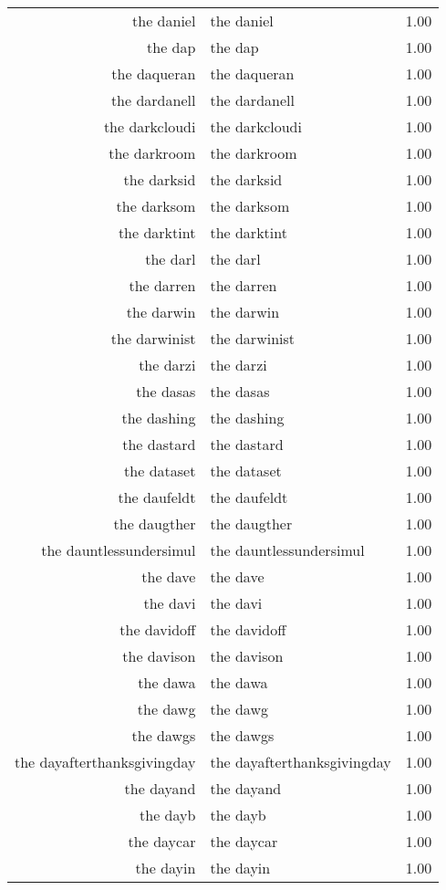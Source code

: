 \begin{table}[ht]
\begin{tabular}{rlr}
  the daniel & the daniel & 1.00 \\ 
  the dap & the dap & 1.00 \\ 
  the daqueran & the daqueran & 1.00 \\ 
  the dardanell & the dardanell & 1.00 \\ 
  the darkcloudi & the darkcloudi & 1.00 \\ 
  the darkroom & the darkroom & 1.00 \\ 
  the darksid & the darksid & 1.00 \\ 
  the darksom & the darksom & 1.00 \\ 
  the darktint & the darktint & 1.00 \\ 
  the darl & the darl & 1.00 \\ 
  the darren & the darren & 1.00 \\ 
  the darwin & the darwin & 1.00 \\ 
  the darwinist & the darwinist & 1.00 \\ 
  the darzi & the darzi & 1.00 \\ 
  the dasas & the dasas & 1.00 \\ 
  the dashing & the dashing & 1.00 \\ 
  the dastard & the dastard & 1.00 \\ 
  the dataset & the dataset & 1.00 \\ 
  the daufeldt & the daufeldt & 1.00 \\ 
  the daugther & the daugther & 1.00 \\ 
  the dauntlessundersimul & the dauntlessundersimul & 1.00 \\ 
  the dave & the dave & 1.00 \\ 
  the davi & the davi & 1.00 \\ 
  the davidoff & the davidoff & 1.00 \\ 
  the davison & the davison & 1.00 \\ 
  the dawa & the dawa & 1.00 \\ 
  the dawg & the dawg & 1.00 \\ 
  the dawgs & the dawgs & 1.00 \\ 
  the dayafterthanksgivingday & the dayafterthanksgivingday & 1.00 \\ 
  the dayand & the dayand & 1.00 \\ 
  the dayb & the dayb & 1.00 \\ 
  the daycar & the daycar & 1.00 \\ 
  the dayin & the dayin & 1.00 \\ 

\end{tabular}
\end{table}

